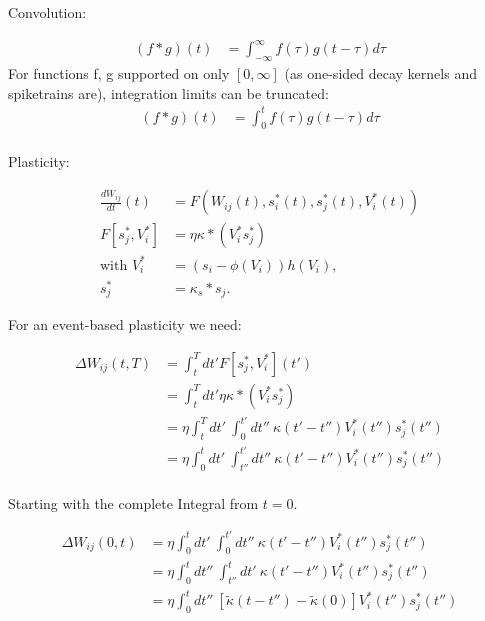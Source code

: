 Convolution:

\begin{align}
  (f \ast g)(t) & = \int_{- \infty }^{\infty} f(\tau) g(t-\tau) d \tau
\end{align}
For functions f, g supported on only $[0, \infty]$ (as one-sided decay kernels and spiketrains are), integration limits can be truncated:
\begin{align}
  (f \ast g)(t) & = \int_{0}^{t} f(\tau) g(t-\tau) d \tau \\
\end{align}


Plasticity:

\begin{align}
  \frac{dW_{ij}}{dt}(t) & = F(W_{ij}(t), s_i^\ast (t), s_j^\ast (t), V_i^\ast (t)) \\
  F[s_j^\ast, V_i^\ast] & = \eta \kappa \ast (V_i^\ast s_j^\ast)                   \\
  \text{with } V_i^\ast & = (s_i - \phi(V_i )) h(V_i),                             \\
  s_j^\ast              & = \kappa_s \ast s_j.
\end{align}

For an event-based plasticity we need:

\begin{align}
  \Delta W_{ij}(t,T) & = \int_t^T dt' F[s_j^\ast , V_i^\ast ](t')                                                 \\
                     & = \int_t^T dt' \eta \kappa \ast (V_i^\ast s_j^\ast)                                        \\
                     & = \eta \int_t^T dt' \  \int_0^{t'} dt'' \ \kappa(t'-t'') V_i^\ast (t'') s_j^\ast (t'')     \\
                     & = \eta \int_0^t dt' \  \int_{t''}^{t'} dt'' \ \kappa(t'-t'') V_i^\ast (t'') s_j^\ast (t'') \\
\end{align}


Starting with the complete Integral from $t=0$.

\begin{align}
  \Delta W_{ij}(0,t) & =\eta \int_0^t dt' \  \int_0^{t'} dt'' \ \kappa(t'-t'') V_i^\ast (t'') s_j^\ast (t'')                          \\
                     & = \eta \int_0^t dt'' \  \int_{t''}^{t} dt' \ \kappa(t'-t'') V_i^\ast (t'') s_j^\ast (t'')                      \\
                     & = \eta \int_0^t dt'' \  \left[ \tilde{\kappa}(t-t'') - \tilde{\kappa}(0) \right] V_i^\ast (t'') s_j^\ast (t'') \\
\end{align}

